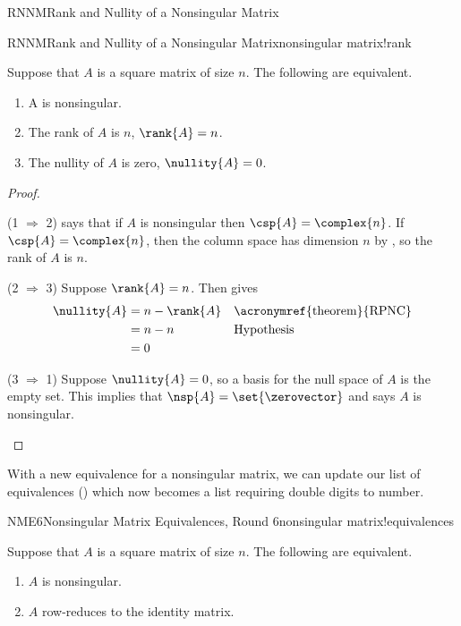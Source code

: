 \begin{subsect}{RNNM}{Rank and Nullity of a Nonsingular Matrix}
\begin{theorem}{RNNM}{Rank and Nullity of a Nonsingular Matrix}{nonsingular matrix!rank}
\begin{para}Suppose that $A$ is a square matrix of size $n$.  The following are equivalent.
%
\begin{enumerate}
\item A is nonsingular.
\item The rank of $A$ is $n$, $\rank{A}=n$.
\item The nullity of $A$ is zero, $\nullity{A}=0$.
\end{enumerate}
\end{para}
%
\end{theorem}
%
\begin{proof}
\begin{para}(1 $\Rightarrow$ 2)   says that if $A$ is nonsingular then $\csp{A}=\complex{n}$.  If $\csp{A}=\complex{n}$, then the column space has dimension $n$ by , so the rank of $A$ is $n$.\end{para}
%
\begin{para}(2 $\Rightarrow$ 3)  Suppose $\rank{A}=n$.  Then  gives
%
\begin{align*}
\nullity{A}&=n-\rank{A}&&\text{\acronymref{theorem}{RPNC}}\\
&=n-n&&\text{Hypothesis}\\
&=0
\end{align*}
\end{para}
%
\begin{para}(3 $\Rightarrow$ 1)  Suppose $\nullity{A}=0$, so a basis for the null space of $A$ is the empty set.  This implies that $\nsp{A}=\set{\zerovector}$ and  says $A$ is nonsingular.\end{para}
\end{proof}
%
\begin{para}With a new equivalence for a nonsingular matrix, we can update our list of equivalences () which now becomes a list requiring double digits to number.\end{para}
%
\begin{theorem}{NME6}{Nonsingular Matrix Equivalences, Round 6}{nonsingular matrix!equivalences}
\begin{para}Suppose that $A$ is a square matrix of size $n$.  The following are equivalent.
%
\begin{enumerate}
\item $A$ is nonsingular.
\item $A$ row-reduces to the identity matrix.

\end{enumerate}
\end{para}
\end{theorem}
\end{subsect}
